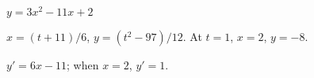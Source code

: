 {$y=3x^2-11x+2$
}
{$x=(t+11)/6$, $y=(t^2-97)/12$. At $t=1$, $x=2$, $y=-8$.

$y'=6x-11$; when $x=2$, $y'=1$.
}